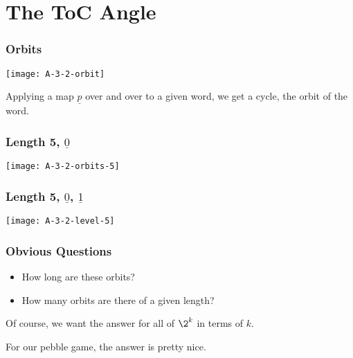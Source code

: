 \documentclass[handout,10pt]{ksbeamer}
\let\emph=\alert
\def\F#1{\underline{#1}}
\begin{document}
\section{The ToC Angle}
\frame{\tableofcontents[current]}


\begin{frame}
\frametitle{Orbits}

\begin{center}
\texttt{[image: A-3-2-orbit]}
\end{center}

Applying a map  $\F{p}$ over and over to a given word, we get a cycle, 
the \emph{orbit} of the word. 

\end{frame}



\begin{frame}
\frametitle{Length 5,  $\F{0}$ }

\begin{center}
\texttt{[image: A-3-2-orbits-5]}
\end{center}


\end{frame}

\begin{frame}
\frametitle{Length 5,   $\F{0}$, $\F{1}$ }

\begin{center}
\texttt{[image: A-3-2-level-5]}
\end{center}


\end{frame}



\begin{frame}
\frametitle{Obvious Questions}

\begin{itemize}
\addtolength{\itemsep}{3mm}
\item  How long are these orbits? 
\item  How many orbits are there of a given length? 
\end{itemize}
\vspace{5ex} 


Of course, we want the answer for all of $\2^{k}$ in terms of $k$. 
\vspace{3ex} 

For our pebble game, the answer is pretty nice. 

\end{frame}
\end{document}
